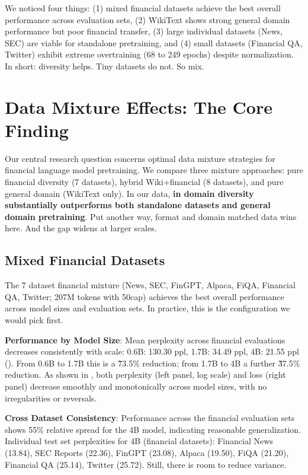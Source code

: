 We noticed four things: (1) mixed financial datasets achieve the best overall performance across evaluation sets, (2) WikiText shows strong general domain performance but poor financial transfer, (3) large individual datasets (News, SEC) are viable for standalone pretraining, and (4) small datasets (Financial QA, Twitter) exhibit extreme overtraining (68 to 249 epochs) despite normalization. In short: diversity helps. Tiny datasets do not. So mix.

\section{Data Mixture Effects: The Core Finding}

Our central research question concerns optimal data mixture strategies for financial language model pretraining. We compare three mixture approaches: pure financial diversity (7 datasets), hybrid Wiki+financial (8 datasets), and pure general domain (WikiText only). In our data, \textbf{in domain diversity substantially outperforms both standalone datasets and general domain pretraining}. Put another way, format  and domain matched data wins here. And the gap widens at larger scales.

\subsection{Mixed Financial Datasets}

The 7 dataset financial mixture (News, SEC, FinGPT, Alpaca, FiQA, Financial QA, Twitter; 207M tokens with 50cap) achieves the best overall performance across model sizes and evaluation sets. In practice, this is the configuration we would pick first.

\textbf{Performance by Model Size}: Mean perplexity across financial evaluations decreases consistently with scale: 0.6B: 130.30 ppl, 1.7B: 34.49 ppl, 4B: 21.55 ppl (). From 0.6B to 1.7B this is a \~73.5\% reduction; from 1.7B to 4B a further \~37.5\% reduction. As shown in , both perplexity (left panel, log scale) and loss (right panel) decrease smoothly and monotonically across model sizes, with no irregularities or reversals.

\textbf{Cross Dataset Consistency}: Performance across the financial evaluation sets shows 55\% relative spread for the 4B model, indicating reasonable generalization. Individual test set perplexities for 4B (financial datasets): Financial News (13.84), SEC Reports (22.36), FinGPT (23.08), Alpaca (19.50), FiQA (21.20), Financial QA (25.14), Twitter (25.72). Still, there is room to reduce variance.

